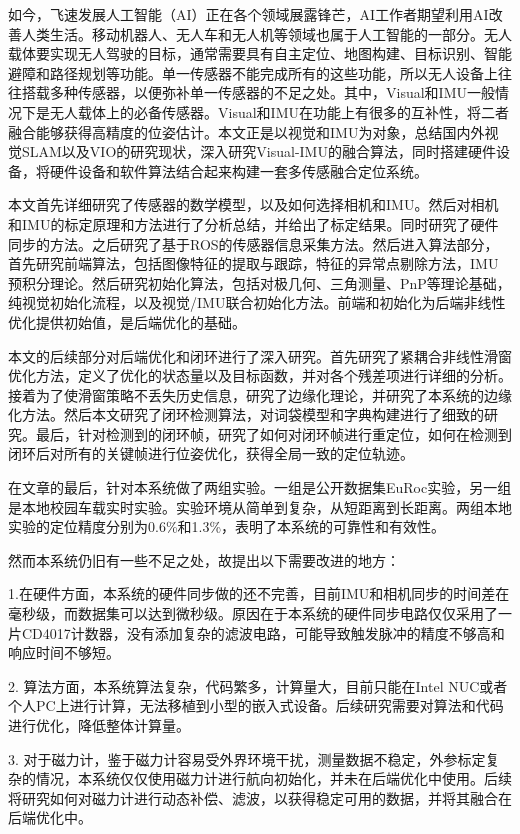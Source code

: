 

\begin{conclusion}
如今，飞速发展人工智能（AI）正在各个领域展露锋芒，AI工作者期望利用AI改善人类生活。移动机器人、无人车和无人机等领域也属于人工智能的一部分。无人载体要实现无人驾驶的目标，通常需要具有自主定位、地图构建、目标识别、智能避障和路径规划等功能。单一传感器不能完成所有的这些功能，所以无人设备上往往搭载多种传感器，以便弥补单一传感器的不足之处。其中，Visual和IMU一般情况下是无人载体上的必备传感器。Visual和IMU在功能上有很多的互补性，将二者融合能够获得高精度的位姿估计。本文正是以视觉和IMU为对象，总结国内外视觉SLAM以及VIO的研究现状，深入研究Visual-IMU的融合算法，同时搭建硬件设备，将硬件设备和软件算法结合起来构建一套多传感融合定位系统。

本文首先详细研究了传感器的数学模型，以及如何选择相机和IMU。然后对相机和IMU的标定原理和方法进行了分析总结，并给出了标定结果。同时研究了硬件同步的方法。之后研究了基于ROS的传感器信息采集方法。然后进入算法部分，首先研究前端算法，包括图像特征的提取与跟踪，特征的异常点剔除方法，IMU预积分理论。然后研究初始化算法，包括对极几何、三角测量、PnP等理论基础，纯视觉初始化流程，以及视觉/IMU联合初始化方法。前端和初始化为后端非线性优化提供初始值，是后端优化的基础。

本文的后续部分对后端优化和闭环进行了深入研究。首先研究了紧耦合非线性滑窗优化方法，定义了优化的状态量以及目标函数，并对各个残差项进行详细的分析。接着为了使滑窗策略不丢失历史信息，研究了边缘化理论，并研究了本系统的边缘化方法。然后本文研究了闭环检测算法，对词袋模型和字典构建进行了细致的研究。最后，针对检测到的闭环帧，研究了如何对闭环帧进行重定位，如何在检测到闭环后对所有的关键帧进行位姿优化，获得全局一致的定位轨迹。

在文章的最后，针对本系统做了两组实验。一组是公开数据集EuRoc实验，另一组是本地校园车载实时实验。实验环境从简单到复杂，从短距离到长距离。两组本地实验的定位精度分别为0.6\%和1.3\%，表明了本系统的可靠性和有效性。

然而本系统仍旧有一些不足之处，故提出以下需要改进的地方：

1.在硬件方面，本系统的硬件同步做的还不完善，目前IMU和相机同步的时间差在毫秒级，而数据集可以达到微秒级。原因在于本系统的硬件同步电路仅仅采用了一片CD4017计数器，没有添加复杂的滤波电路，可能导致触发脉冲的精度不够高和响应时间不够短。

2. 算法方面，本系统算法复杂，代码繁多，计算量大，目前只能在Intel NUC或者个人PC上进行计算，无法移植到小型的嵌入式设备。后续研究需要对算法和代码进行优化，降低整体计算量。

3. 对于磁力计，鉴于磁力计容易受外界环境干扰，测量数据不稳定，外参标定复杂的情况，本系统仅仅使用磁力计进行航向初始化，并未在后端优化中使用。后续将研究如何对磁力计进行动态补偿、滤波，以获得稳定可用的数据，并将其融合在后端优化中。
\end{conclusion}